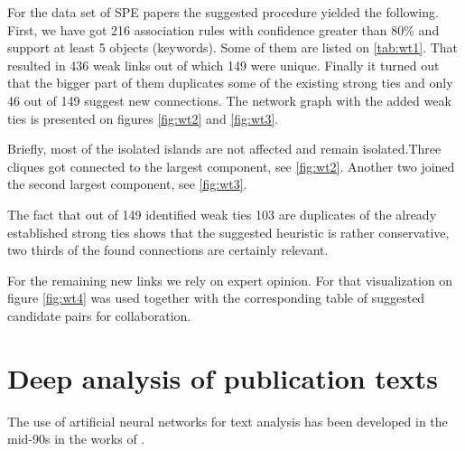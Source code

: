 \documentclass[12pt]{report}
\theoremstyle{definition}
\begin{document}

For the data set of SPE papers the suggested procedure yielded the following.
First, we have got 216 association rules with confidence greater than 80\% and support at least 5 objects (keywords). 
Some of them are listed on \ref{tab:wt1}. 
That resulted in 436 weak links out of which 149 were unique. 
Finally it turned out that the bigger part of them duplicates some of the existing strong ties and only 46 out of 149 suggest new connections.
The network graph with the added weak ties is presented on figures \ref{fig:wt2} and \ref{fig:wt3}.

Briefly, most of the isolated islands are not affected and remain isolated.Three cliques got connected to the largest component, see \ref{fig:wt2}.
Another two joined the second largest component, see \ref{fig:wt3}.

The fact that out of 149 identified weak ties 103 are duplicates of the already established strong ties shows that the suggested heuristic is rather conservative, two thirds of the found connections are certainly relevant.

For the remaining new links we rely on expert opinion. For that visualization on figure \ref{fig:wt4} was used together with the corresponding table of suggested candidate pairs for collaboration. 
%

\section{Deep analysis of publication texts}
\label{seq:emo}
The use of artificial neural networks for text analysis has been developed
in the mid-90s in the works of \cite{ng1997feature, lam1999feature, lam1999automatic}. 
\end{document}
